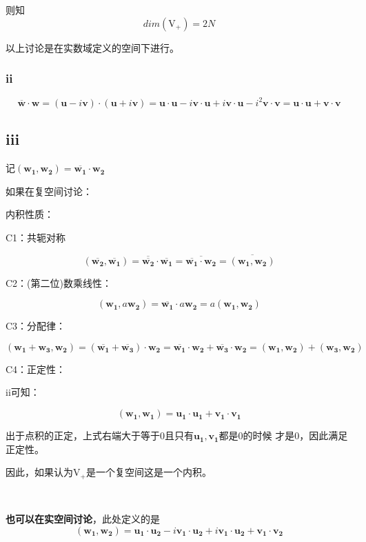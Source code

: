 \documentclass[UTF8,c5size]{ctexart}
\begin{document}
则知
$$
dim(\mathrm{V_+})=2N
$$

以上讨论是在实数域定义的空间下进行。

\subsubsection*{ii}

\begin{equation*}
    \overline{\bm{w}}\cdot{\bm{w}}
    =(\bm{u}-i\bm{v})\cdot(\bm{u}+i\bm{v})
    =\bm{u}\cdot\bm{u}-i\bm{v}\cdot\bm{u}+i\bm{v}\cdot\bm{u}
    -i^2\bm{v}\cdot\bm{v}=\bm{u}\cdot\bm{u}+\bm{v}\cdot\bm{v}
\end{equation*}

\subsection*{iii}

记$(\bm{w_1},\bm{w_2})=\overline{\bm{w_1}} \cdot \bm{w_2}$

如果在复空间讨论：

内积性质：

C1：共轭对称

$$
(\overline{\bm{w_2}},\overline{\bm{w_1}})
=\overline{\overline{\bm{w_2}}}\cdot\overline{\bm{w_1}}
=\overline{\overline{\bm{w_1}} \cdot \bm{w_2}}=\overline{(\bm{w_1},\bm{w_2})}
$$

C2：(第二位)数乘线性：

$$
(\bm{w_1},a\bm{w_2})=\overline{\bm{w_1}} \cdot a\bm{w_2}={a}(\bm{w_1},\bm{w_2})
$$

C3：分配律：

$$
(\bm{w_1}+\bm{w_3},\bm{w_2})=
(\overline{\bm{w_1}}+\overline{\bm{w_3}}) \cdot \bm{w_2}
=\overline{\bm{w_1}} \cdot \bm{w_2}+\overline{\bm{w_3}} \cdot \bm{w_2}
=(\bm{w_1},\bm{w_2})+(\bm{w_3},\bm{w_2})
$$

C4：正定性：

ii可知：

$$
(\bm{w_1},\bm{w_1})=\bm{u_1} \cdot \bm{u_1}+\bm{v_1} \cdot \bm{v_1}
$$

出于点积的正定，上式右端大于等于0且只有$\bm{u_1},\bm{v_1}$都是0的时候
才是0，因此满足正定性。

因此，如果认为$\mathrm{V_+}$是一个复空间这是一个内积。

\ \ 

{\bf{也可以在实空间讨论}}，此处定义的是
$$
(\bm{w_1},\bm{w_2})=
\bm{u_1}\cdot\bm{u_2}
-i\bm{v_1}\cdot\bm{u_2}+i\bm{v_1}\cdot\bm{u_2}
+\bm{v_1}\cdot\bm{v_2}
$$
\end{document}
